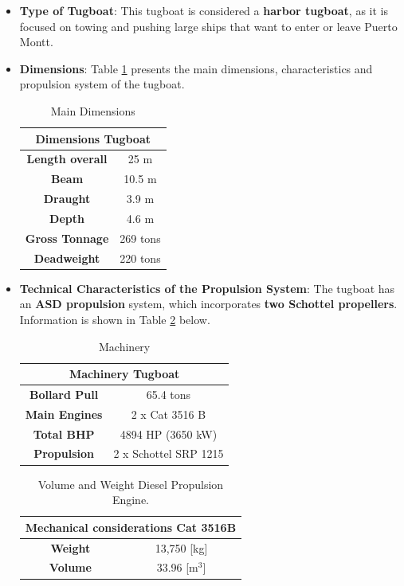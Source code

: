 \begin{itemize}
	\item \textbf{Type of Tugboat}: This tugboat is considered a \textbf{harbor tugboat}, as it is focused on towing and pushing large ships that want to enter or leave Puerto Montt.
	\item \textbf{Dimensions}: Table \ref{tab:DimTug} presents the main dimensions, characteristics and propulsion system of the tugboat.
	\begin{table}[H]
	\centering
	\caption{Main Dimensions}
	\label{tab:DimTug}
	\begin{tabular}{|c|c|}
		\hline
		\multicolumn{2}{|c|}{\textbf{Dimensions Tugboat}} \\
		\hline\hline
		\textbf{Length overall} & 25 m    \\
		\hline  
		\textbf{Beam} & 10.5 m    \\
		\hline
		\textbf{Draught} & 3.9 m    \\
		\hline
		\textbf{Depth} & 4.6 m    \\ 
		\hline
		\textbf{Gross Tonnage} & 269 tons    \\
		\hline 
		\textbf{Deadweight} & 220 tons    \\ 
		\hline
	\end{tabular}
\end{table}
	
	\item \textbf{Technical Characteristics of the Propulsion System}: The tugboat has an \textbf{ASD propulsion} system, which incorporates \textbf{two Schottel propellers}. Information is shown in Table \ref{tab:Machinery_Tug} below.
	\begin{table}[H]
	\centering
	\caption{Machinery}
	\label{tab:Machinery_Tug}
	\begin{tabular}{|c|c|}
		\hline
		\multicolumn{2}{|c|}{\textbf{Machinery Tugboat}} \\
		\hline\hline
		\textbf{Bollard Pull} & 65.4 tons    \\	
		\hline
		\textbf{Main Engines} & 2 x Cat 3516 B    \\
		\hline  
		\textbf{Total BHP} & 4894 HP (3650 kW)    \\		
		\hline		
		\textbf{Propulsion} & 2 x Schottel SRP 1215    \\
		\hline 
	\end{tabular}
	\end{table} 

\begin{table}[H]
	\centering
	\caption{Volume and Weight Diesel Propulsion Engine.}
	\label{tab:VW_Cat3516B}
	\begin{tabular}{|c|c|}
		\hline
		\multicolumn{2}{|c|}{\textbf{Mechanical considerations Cat 3516B}} \\
		\hline\hline
		\textbf{Weight} & 13,750 [kg]    \\
		\hline 
		\textbf{Volume} & 33.96 [${\text{m}}^{3}$]    \\
		\hline 
	\end{tabular}
\end{table}	




\end{itemize}
